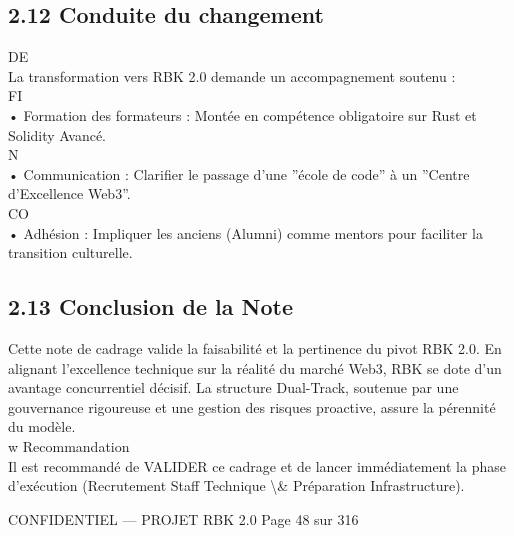 \subsection{2.12 Conduite du changement}
\vspace{0.5em}
\vspace{0.5em}
\vspace{0.5em}
\vspace{0.5em}
DE\\
La transformation vers RBK 2.0 demande un accompagnement soutenu :\\
\vspace{0.5em}
\vspace{0.5em}
\vspace{0.5em}
\vspace{0.5em}
FI\\
• Formation des formateurs : Montée en compétence obligatoire sur Rust et Solidity Avancé.\\
\vspace{0.5em}
\vspace{0.5em}
\vspace{0.5em}
N\\
• Communication : Clarifier le passage d’une ”école de code” à un ”Centre d’Excellence Web3”.\\
CO\\
• Adhésion : Impliquer les anciens (Alumni) comme mentors pour faciliter la transition culturelle.\\
\vspace{0.5em}
\vspace{0.5em}
\vspace{0.5em}
\subsection{2.13 Conclusion de la Note}
Cette note de cadrage valide la faisabilité et la pertinence du pivot RBK 2.0. En alignant l’excellence technique sur la réalité du marché Web3, RBK se dote d’un\\
avantage concurrentiel décisif. La structure Dual-Track, soutenue par une gouvernance rigoureuse et une gestion des risques proactive, assure la pérennité du modèle.\\
\vspace{0.5em}
w Recommandation\\
Il est recommandé de VALIDER ce cadrage et de lancer immédiatement la phase d’exécution (Recrutement Staff Technique \textbackslash{}& Préparation Infrastructure).\\
\vspace{0.5em}
\vspace{0.5em}
\vspace{0.5em}
\vspace{0.5em}
\begin{confidential}CONFIDENTIEL — PROJET RBK 2.0                                            Page 48 sur 316\end{confidential}
